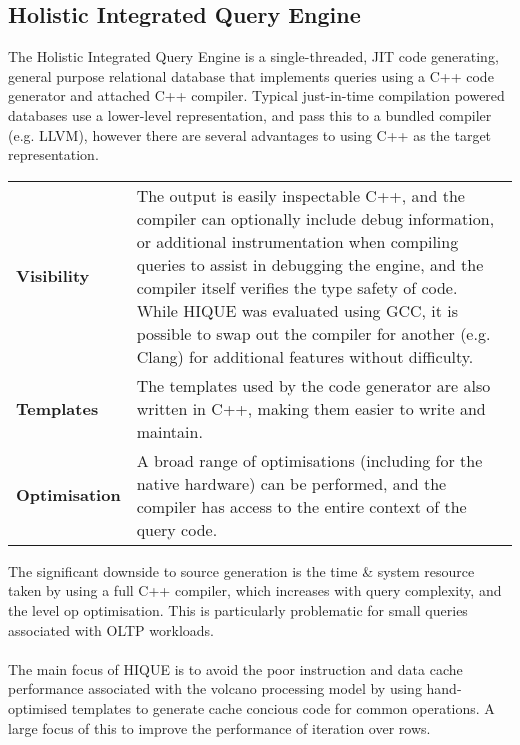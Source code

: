 \subsection{Holistic Integrated Query Engine}
The Holistic Integrated Query Engine\cite{HIQUEPaper} is a single-threaded, JIT code generating, general purpose relational database that implements queries using a C++ code generator and attached C++ compiler.
Typical just-in-time compilation powered databases use a lower-level representation, and pass this to a bundled compiler (e.g. LLVM), however there are several advantages to using C++ as the target representation.
\begin{center}
    \begin{tabular}{l p{}}
        \textbf{Visibility}   & The output is easily inspectable C++, and the compiler can optionally include debug information, or additional instrumentation when compiling queries to assist in debugging the engine, and the compiler itself verifies the type safety of code. While HIQUE was evaluated using GCC, it is possible to swap out the compiler for another (e.g. Clang) for additional features without difficulty. \\
        \textbf{Templates}    & The templates used by the code generator are also written in C++, making them easier to write and maintain.                                                                                                                                                                                                                                                                                          \\
        \textbf{Optimisation} & A broad range of optimisations (including for the native hardware) can be performed, and the compiler has access to the entire context of the query code.
    \end{tabular}
\end{center}
The significant downside to source generation is the time \& system resource taken by using a full C++ compiler, which increases with query complexity, and the level op optimisation. This is particularly problematic for small queries associated with OLTP workloads.
\\
\\ The main focus of HIQUE is to avoid the poor instruction and data cache performance associated with the volcano processing model by using hand-optimised templates to generate cache concious code for common operations. A large focus of this to improve the performance of iteration over rows.
